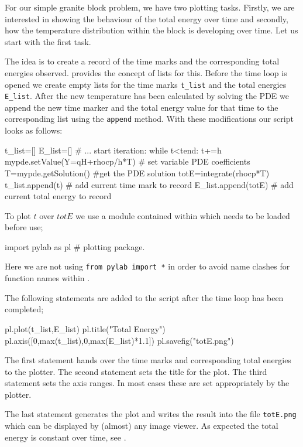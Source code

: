 For our simple granite block problem, we have two plotting tasks. Firstly, we
are interested in showing the
behaviour of the total energy over time and secondly, how the temperature
distribution within the block is developing over time.
Let us start with the first task.

The idea is to create a record of the time marks and the corresponding total
energies observed.
\pyt provides the concept of lists for this. Before 
the time loop is opened we create empty lists for the time marks \verb|t_list|
and the total energies \verb|E_list|. 
After the new temperature has been calculated by solving the PDE we append the
new time marker and the total energy value for that time
to the corresponding list using the \verb|append| method. With these
modifications our script looks as follows:
\begin{python}
t_list=[]
E_list=[]
# ... start iteration:
while t<tend:
      t+=h
      mypde.setValue(Y=qH+rhocp/h*T) # set variable PDE coefficients
      T=mypde.getSolution() #get the PDE solution
      totE=integrate(rhocp*T) 
      t_list.append(t)   # add current time mark to record
      E_list.append(totE) # add current total energy to record
\end{python}
To plot $t$ over $totE$ we use \mpl a module contained within \pylab which needs
to be loaded before use;
\begin{python}
import pylab as pl # plotting package.
\end{python}
Here we are not using \verb|from pylab import *| in order to avoid name
clashes for function names within \esc. 

The following statements are added to the script after the time loop has been
completed;
\begin{python}
pl.plot(t_list,E_list)
pl.title("Total Energy")
pl.axis([0,max(t_list),0,max(E_list)*1.1])
pl.savefig("totE.png")
\end{python}
The first statement hands over the time marks and corresponding total energies
to the plotter.
The second statement sets the title for the plot. The third statement
sets the axis ranges. In most cases these are set appropriately by the plotter.
 
The last statement generates the plot and writes the result into the file
\verb|totE.png| which can be displayed by (almost) any image viewer. 
As expected the total energy is constant over time, see
.

